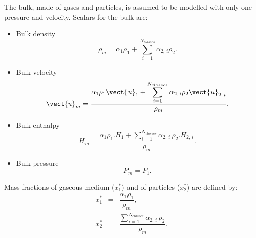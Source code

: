 The bulk, made of gases and particles, is assumed to be modelled with only one pressure and velocity.
Scalars for the bulk are:
\begin{itemize}
  \item Bulk density
     \begin{equation}
        \rho_{m} = \alpha_{1}\rho_{1} + \displaystyle \sum_{i=1}^{N_{classes}}\alpha_{2, \, i}\rho_{2}.
     \end{equation}

  \item Bulk velocity
     \begin{equation}
       \vect{u}_{m} = \dfrac{ \alpha_{1}\rho_{1} \vect{u}_{1}
                    + \displaystyle \sum_{i=1}^{N_{classes}}\alpha_{2, \, i}\rho_{2} \vect{u}_{2, \, i} }{\rho_{m}}.
     \end{equation}

  \item Bulk enthalpy
     \begin{equation}
        H_{m} = \dfrac{ \alpha_{1}\rho_{1}.H_{1}
                     + \displaystyle \sum_{i=1}^{N_{classes}}\alpha_{2, \, i} \,\rho_{2}.H_{2, \, i} }{\rho_{m}}.
     \end{equation}

  \item Bulk pressure
     \begin{equation}
       P_{m} = P_{1}.
     \end{equation}
\end{itemize}

Mass fractions of gaseous medium ($x_{1}^{*}$) and of particles ($x_{2}^{*}$) are defined by:
\begin{eqnarray*}
  x_{1}^{*} &=& \dfrac{\alpha_{1}\rho_{1}}{\rho_{m}} , \\
  x_{2}^{*} &=& \dfrac{\displaystyle \sum_{i=1}^{N_{classes}} \alpha_{2, \,i} \, \rho_{2}}{\rho_{m}}.
\end{eqnarray*}


